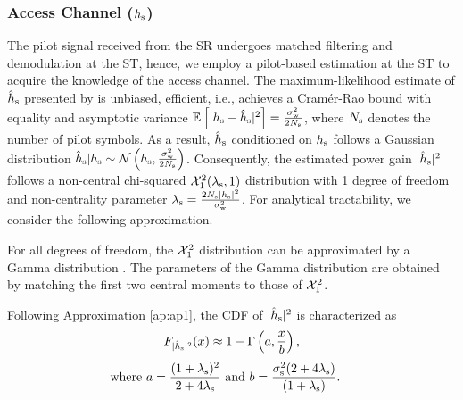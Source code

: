 \subsubsection*{Access Channel ($h_{\text{s}}$)}
The pilot signal received from the SR undergoes matched filtering and demodulation at the ST, hence, we employ a pilot-based estimation at the ST to acquire the knowledge of the access channel. The maximum-likelihood estimate of $\hat{h}_{\text{s}}$ presented by \cite{Gifford08} is unbiased, efficient, i.e., achieves a Cram\'er-Rao bound with equality and asymptotic variance ${\mathbb E}_{}\left[ |h_{\text{s}} -\hat{h}_{\text{s}}|^2 \right] = \frac{\sigma^2_{\text{w}}}{2 N_{\text{s}}}$, where $N_{\text{s}}$ denotes the number of pilot symbols. As a result, $\hat{h}_{\text{s}}$ conditioned on $h_{\text{s}}$ follows a Gaussian distribution
$\hat{h}_{\text{s}}|h_{\text{s}} \sim \mathcal{N}\left( h_{\text{s}},\frac{\sigma^2_{\text{w}}}{2 N_{\text{s}}} \right)$.
Consequently, the estimated power gain $|\hat{h}_{\text{s}}|^2$ follows a non-central chi-squared $\ncchi2(\ls, 1)$ distribution with 1 degree of freedom and non-centrality parameter $\lambda_{\text{s}} = \frac{2 N_{\text{s}} |h_{\text{s}}|^2}{\sigma^2_{\text{w}}}$. For analytical tractability, we consider the following approximation. 
\begin{approxi} \label{ap:ap1}
\normalfont 
For all degrees of freedom, the $\ncchi2$ distribution can be approximated by a Gamma distribution \cite{abramo}. The parameters of the Gamma distribution are obtained by matching the first two central moments to those of $\ncchi2$.
\end{approxi}
Following Approximation \ref{ap:ap1}, the CDF of $|\hat{h}_{\text{s}}|^2$ is characterized as
\begin{align}
F_{|\hat{h}_{\text{s}}|^2}(x) \approx 1 - \Gamma \left(a, \frac{x}{b} \right) \label{eq:fephs}, 
\end{align}
\begin{align}
\text{where  } a = \frac{(1 + \lambda_{\text{s}})^2}{2 + 4 \lambda_{\text{s}}} &\text{ and } b = \frac{\sigma^2_{\text{s}} (2 + 4 \lambda_{\text{s}})}{(1 + \lambda_{\text{s}})}.  \label{eq:para_hs} 
\end{align}


